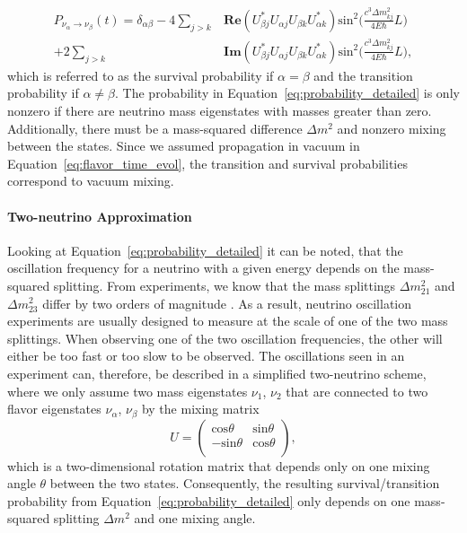 \begin{equation}
    \begin{split}
        P_{\nu_\alpha \rightarrow \nu_\beta}(t)
        = 
        \delta_{\alpha \beta}
        -
        4\sum_{j>k}&\textbf{Re}(U^*_{\beta j}U_{\alpha j}U_{\beta k}U^*_{\alpha k})\textrm{sin}^2\Big( \frac{c^3\Delta m^2_{kj}}{4E\hbar}L \Big) \\
        +
        2\sum_{j>k}&\textbf{Im}(U^*_{\beta j}U_{\alpha j}U_{\beta k}U^*_{\alpha k})\textrm{sin}^2\Big( \frac{c^3\Delta m^2_{kj}}{4E\hbar}L \Big),
    \end{split}
    \label{eq:probability_detailed}
\end{equation}
which is referred to as the survival probability if $\alpha=\beta$ and the transition probability if $\alpha\neq\beta$.
The probability in Equation~\ref{eq:probability_detailed} is only nonzero if there are neutrino mass eigenstates with masses greater than zero.
Additionally, there must be a mass-squared difference $\Delta m^2$ and nonzero mixing between the states.
Since we assumed propagation in vacuum in Equation~\ref{eq:flavor_time_evol}, the transition and survival probabilities correspond to vacuum mixing.

\paragraph{Two-neutrino Approximation}

Looking at Equation~\eqref{eq:probability_detailed} it can be noted, that the oscillation frequency for a neutrino with a given energy depends on the mass-squared splitting.
From experiments, we know that the mass splittings $\Delta m^2_{21}$ and $\Delta m^2_{23}$ differ by two orders of magnitude \cite{PhysRevD.98.030001}.
As a result, neutrino oscillation experiments are usually designed to measure at the scale of one of the two mass splittings.
When observing one of the two oscillation frequencies, the other will either be too fast or too slow to be observed.
The oscillations seen in an experiment can, therefore, be described in a simplified two-neutrino scheme, where we only assume two mass eigenstates $\nu_1$, $\nu_2$ that are connected to two flavor eigenstates $\nu_\alpha$, $\nu_\beta$ by the mixing matrix
\begin{equation} 
    U=\left( 
        \begin{matrix}
            \mathrm{cos}\theta & \mathrm{sin}\theta \\
            -\mathrm{sin}\theta & \mathrm{cos}\theta \\
        \end{matrix}
        \right),
    \end{equation}
which is a two-dimensional rotation matrix that depends only on one mixing angle $\theta$ between the two states.
Consequently, the resulting survival/transition probability from Equation~\eqref{eq:probability_detailed} only depends on one mass-squared splitting $\Delta m^2$ and one mixing angle.


